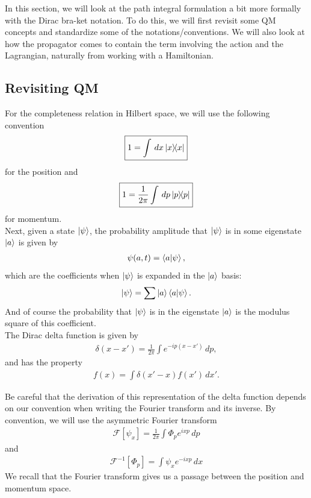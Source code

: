 \documentclass{book}
\theoremstyle{definition}
\newcommand{\f}[2]{\frac{#1}{#2}}
\begin{document}
In this section, we will look at the path integral formulation a bit more formally with the Dirac bra-ket notation. To do this, we will first revisit some QM concepts and standardize some of the notations/conventions. We will also look at how the propagator comes to contain the term involving the action and the Lagrangian, naturally from working with a Hamiltonian.


\subsection{Revisiting QM}


For the completeness relation in Hilbert space, we will use the following convention
\begin{align}
\boxed{1 = \int \,dx \ketbra{x}}
\end{align}
for the position and 
\begin{align}
\boxed{1 = \f{1}{2\pi}\int \,dp \ketbra{p}}
\end{align}
for momentum. \\

Next, given a state $\ket{\psi}$, the probability amplitude that $\ket{\psi}$ is in some eigenstate $\ket{a}$ is given by
\begin{align}
\psi(a,t) = \braket{a}{\psi},
\end{align}
which are the coefficients when $\ket{\psi}$ is expanded in the $\ket{a}$ basis:
\begin{align}
\ket{\psi} = \sum \ket{a}\bra{a}\ket{\psi}.
\end{align}
And of course the probability that $\ket{\psi}$ is in the eigenstate $\ket{a}$ is the modulus square of this coefficient.\\



The Dirac delta function is given by
\begin{align}
\delta(x - x') = \f{1}{2\pi}\int e^{-ip(x-x')}\,dp,
\end{align}
and has the property
\begin{align}
f(x) = \int \delta(x'-x) f(x')\,dx'.
\end{align}

Be careful that the derivation of this representation of the delta function depends on our convention when writing the Fourier transform and its inverse. By convention, we will use the asymmetric Fourier transform 
\begin{align}
\boxed{\mathcal{F}[\psi_x] = \f{1}{2\pi}\int \Phi_p e^{ixp}\,dp}
\end{align} 
and
\begin{align}
\boxed{\mathcal{F}^{-1}[\Phi_p] = \int \psi_x e^{-ixp}\,dx}
\end{align}
We recall that the Fourier transform gives us a passage between the position and momentum space. \\
\end{document}
